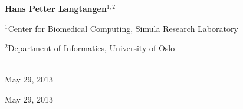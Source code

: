 \documentclass[%
oneside,                 %
final,                   %
10pt]{article}
\begin{document}
\begin{center}
\author{Hans Petter Langtangen}

\begin{center}
{\bf Hans Petter Langtangen${}^{1, 2}$} \\ [0mm]
\end{center}

\begin{center}
\centerline{{\small ${}^1$Center for Biomedical Computing, Simula Research Laboratory}}
\centerline{{\small ${}^2$Department of Informatics, University of Oslo}}
\end{center}


\date{May 29, 2013}
\maketitle
\date{May 29, 2013
}

\ \\ [10mm]
{\large\textsf{May 29, 2013}}

\end{center}
\vfill
\clearpage

\begin{center}
May 29, 2013
\end{center}

\vspace{1cm}

\end{document}
